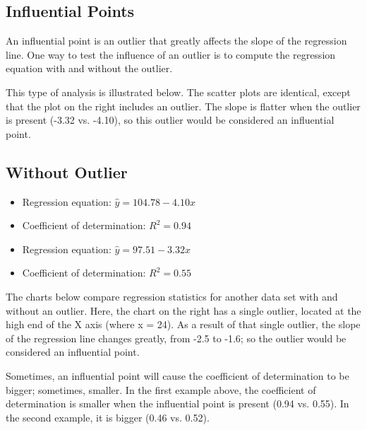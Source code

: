 \documentclass[residuals.tex]{subfiles}
\begin{document}
	
	\subsection{Influential Points}
	
	An influential point is an outlier that greatly affects the slope of the regression line. One way to test the influence of an outlier is to compute the regression equation with and without the outlier.
	
	This type of analysis is illustrated below. The scatter plots are identical, except that the plot on the right includes an outlier. The slope is flatter when the outlier is present (-3.32 vs. -4.10), so this outlier would be considered an influential point.
	
	\subsection{Without Outlier}
	
	
	\begin{itemize}
		\item Regression equation: $\hat{y} = 104.78 - 4.10x$
		\item Coefficient of determination: $R^2 = 0.94$ 
	\end{itemize}
	\begin{itemize}
		\item Regression equation: $\hat{y} = 97.51 - 3.32x$
		\item Coefficient of determination: $R^2 = 0.55$ 
	\end{itemize}
	
	The charts below compare regression statistics for another data set with and without an outlier. Here, the chart on the right has a single outlier, located at the high end of the X axis (where x = 24). As a result of that single outlier, the slope of the regression line changes greatly, from -2.5 to -1.6; so the outlier would be considered an influential point.
	
	
	
	
	
	Sometimes, an influential point will cause the coefficient of determination to be bigger; sometimes, smaller. In the first example above, the coefficient of determination is smaller when the influential point is present (0.94 vs. 0.55). In the second example, it is bigger (0.46 vs. 0.52).
	
\end{document}

